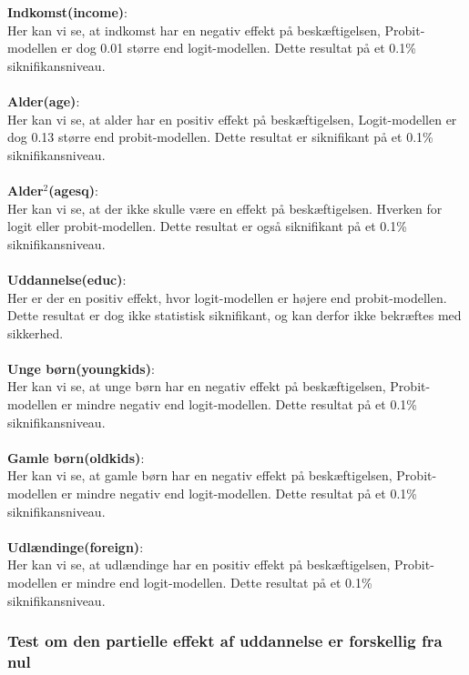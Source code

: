 \documentclass[
  10pt,
]{article}
\begin{document}
\newpage

\textbf{Indkomst(income)}:\\
Her kan vi se, at indkomst har en negativ effekt på beskæftigelsen,
Probit-modellen er dog 0.01 større end logit-modellen. Dette resultat på
et 0.1\% siknifikansniveau.\\
~\\
\textbf{Alder(age)}:\\
Her kan vi se, at alder har en positiv effekt på beskæftigelsen,
Logit-modellen er dog 0.13 større end probit-modellen. Dette resultat er
siknifikant på et 0.1\% siknifikansniveau.\\
~\\
\textbf{Alder$^2$(agesq)}:\\
Her kan vi se, at der ikke skulle være en effekt på beskæftigelsen.
Hverken for logit eller probit-modellen. Dette resultat er også
siknifikant på et 0.1\% siknifikansniveau.\\
~\\
\textbf{Uddannelse(educ)}:\\
Her er der en positiv effekt, hvor logit-modellen er højere end
probit-modellen. Dette resultat er dog ikke statistisk siknifikant, og
kan derfor ikke bekræftes med sikkerhed.\\
~\\
\textbf{Unge børn(youngkids)}:\\
Her kan vi se, at unge børn har en negativ effekt på beskæftigelsen,
Probit-modellen er mindre negativ end logit-modellen. Dette resultat på
et 0.1\% siknifikansniveau.\\
~\\
\textbf{Gamle børn(oldkids)}:\\
Her kan vi se, at gamle børn har en negativ effekt på beskæftigelsen,
Probit-modellen er mindre negativ end logit-modellen. Dette resultat på
et 0.1\% siknifikansniveau.\\
~\\
\textbf{Udlændinge(foreign)}:\\
Her kan vi se, at udlændinge har en positiv effekt på beskæftigelsen,
Probit-modellen er mindre end logit-modellen. Dette resultat på et 0.1\%
siknifikansniveau.\\
\newpage

\hypertarget{test-om-den-partielle-effekt-af-uddannelse-er-forskellig-fra-nul}{%
\subsubsection{Test om den partielle effekt af uddannelse er forskellig
fra
nul}\label{test-om-den-partielle-effekt-af-uddannelse-er-forskellig-fra-nul}}
\end{document}
